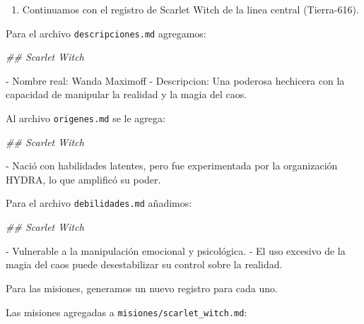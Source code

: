 \documentclass[
]{book}
\newenvironment{Shaded}{\begin{snugshade}}{\end{snugshade}}
\newcommand{\CommentTok}[1]{\textcolor[rgb]{0.56,0.35,0.01}{\textit{#1}}}
\newcommand{\ExtensionTok}[1]{#1}
\newcommand{\NormalTok}[1]{#1}
\providecommand{\tightlist}{%
  \setlength{\itemsep}{0pt}\setlength{\parskip}{0pt}}
\begin{document}
\begin{enumerate}
\def\labelenumi{\arabic{enumi}.}
\setcounter{enumi}{3}
\tightlist
\item
  Continuamos con el registro de Scarlet Witch de la linea central (Tierra-616).
\end{enumerate}

Para el archivo \texttt{descripciones.md} agregamos:

\begin{Shaded}
\begin{Highlighting}[]

\CommentTok{\#\# Scarlet Witch}

\ExtensionTok{{-}}\NormalTok{ Nombre real: Wanda Maximoff}
\ExtensionTok{{-}}\NormalTok{ Descripcion: Una poderosa hechicera con la capacidad de manipular la realidad y la magia del caos.}
\end{Highlighting}
\end{Shaded}

Al archivo \texttt{origenes.md} se le agrega:

\begin{Shaded}
\begin{Highlighting}[]

\CommentTok{\#\# Scarlet Witch}

\ExtensionTok{{-}}\NormalTok{ Nació con habilidades latentes, pero fue experimentada por la organización HYDRA, lo que amplificó su poder.}
\end{Highlighting}
\end{Shaded}

Para el archivo \texttt{debilidades.md} añadimos:

\begin{Shaded}
\begin{Highlighting}[]

\CommentTok{\#\# Scarlet Witch}

\ExtensionTok{{-}}\NormalTok{ Vulnerable a la manipulación emocional y psicológica.}
\ExtensionTok{{-}}\NormalTok{ El uso excesivo de la magia del caos puede desestabilizar su control sobre la realidad.}
\end{Highlighting}
\end{Shaded}

Para las misiones, generamos un nuevo registro para cada uno.

Las misiones agregadas a \texttt{misiones/scarlet\_witch.md}:
\end{document}
